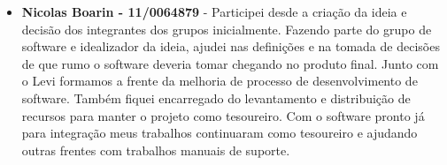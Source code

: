 \begin{apendicesenv}
\begin{itemize}
		\item \textbf{Nicolas Boarin - 11/0064879}  - Participei desde a criação da ideia e decisão dos integrantes dos grupos inicialmente. Fazendo parte do grupo de software e idealizador da ideia, ajudei nas definições e na tomada de decisões de que rumo o software deveria tomar chegando no produto final. Junto com o Levi formamos a frente da melhoria de processo de desenvolvimento de software. Também fiquei encarregado do levantamento e distribuição de recursos para manter o projeto como tesoureiro. Com o software pronto já para integração meus trabalhos continuaram como tesoureiro e ajudando outras frentes com trabalhos manuais de suporte.
	\end{itemize}
\end{apendicesenv}

